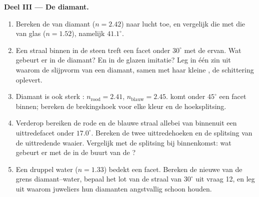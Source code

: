 \begin{problem}
\medskip
\noindent\textbf{Deel III --- De diamant.}
\begin{enumerate}[resume]
  \item Bereken de  van diamant ($n = 2.42$) naar lucht toe, en
        vergelijk die met die van glas ($n = 1.52$), namelijk
        $41.1^\circ$.
  \item Een straal binnen in de steen treft een facet onder $30^\circ$
        met de  ervan. Wat gebeurt er in de diamant? En in de
        glazen imitatie? Leg in één zin uit waarom de slijpvorm van een
        diamant, samen met haar kleine , de schittering
        oplevert.
  \item Diamant is ook sterk : $n_{\text{rood}} = 2.41$,
        $n_{\text{blauw}} = 2.45$.  komt onder $45^\circ$ een
        facet binnen; bereken de brekingshoek voor elke kleur en de
        hoeksplitsing.
  \item Verderop bereiken de rode en de blauwe straal allebei van
        binnenuit een uittredefacet onder $17.0^\circ$. Bereken de twee
        uittredehoeken en de splitsing van de uittredende waaier.
        Vergelijk met de splitsing bij binnenkomst: wat gebeurt er met
        de  in de buurt van de ?
  \item Een druppel water ($n = 1.33$) bedekt een facet. Bereken de
        nieuwe  van de grens diamant--water, bepaal het lot van
        de straal van $30^\circ$ uit vraag 12, en leg uit waarom
        juweliers hun diamanten angstvallig schoon houden.
\end{enumerate}


\end{problem}
